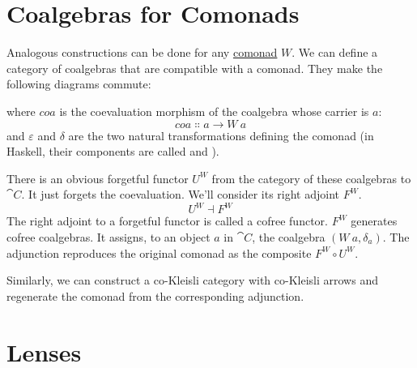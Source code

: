\section{Coalgebras for Comonads}

Analogous constructions can be done for any
\hyperref[comonads]{comonad}
$W$. We can define a category of coalgebras that are compatible
with a comonad. They make the following diagrams commute:

\begin{figure}[H]
  \centering
  \begin{subfigure}
    \centering
  \end{subfigure}%
  \hspace{1cm}
  \begin{subfigure}
    \centering
  \end{subfigure}
\end{figure}

\noindent
where $coa$ is the coevaluation morphism of the coalgebra whose
carrier is $a$:
\[coa \Colon a \to W\ a\]
and $\varepsilon$ and $\delta$ are the two natural transformations
defining the comonad (in Haskell, their components are called
 and ).

There is an obvious forgetful functor $U^W$ from the category of
these coalgebras to $\cat{C}$. It just forgets the coevaluation. We'll
consider its right adjoint $F^W$.
\[U^W \dashv F^W\]
The right adjoint to a forgetful functor is called a cofree functor.
$F^W$ generates cofree coalgebras. It assigns, to an object
$a$ in $\cat{C}$, the coalgebra $(W\ a, \delta_a)$. The
adjunction reproduces the original comonad as the composite
$F^W \circ U^W$.

Similarly, we can construct a co-Kleisli category with co-Kleisli arrows
and regenerate the comonad from the corresponding adjunction.

\section{Lenses}

